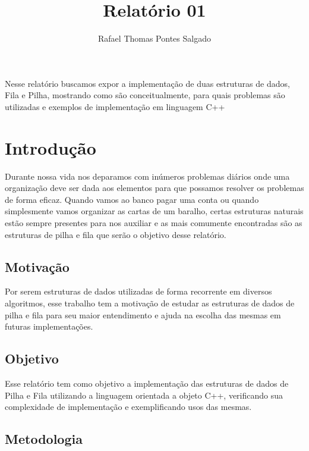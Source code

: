 \documentclass[rascunho,xindy,sublist]{fei}
\author{Rafael Thomas Pontes Salgado}
\title{Relatório 01}
\begin{document}
\maketitle

\begin{resumo}
Nesse relatório buscamos expor a implementação de duas estruturas de dados, Fila e Pilha, mostrando como são conceitualmente, para quais problemas são utilizadas e exemplos de implementação em linguagem C++ 
\end{resumo}

\listoffigures
\listoftables
\printglossaries
\tableofcontents

\chapter{Introdução}

Durante nossa vida nos deparamos com inúmeros problemas diários onde uma organização deve ser dada aos elementos para que possamos resolver os problemas de forma eficaz. Quando vamos ao banco pagar uma conta ou quando simplesmente vamos organizar as cartas de um baralho, certas estruturas naturais estão sempre presentes para nos auxiliar e as mais comumente encontradas são as estruturas de pilha e fila que serão o objetivo desse relatório.

\section{Motivação}

Por serem estruturas de dados utilizadas de forma recorrente em diversos algoritmos, esse trabalho tem a motivação de estudar as estruturas de dados de pilha e fila para seu maior entendimento e ajuda na escolha das mesmas em futuras implementações.

\section{Objetivo}

Esse relatório tem como objetivo a implementação das estruturas de dados de Pilha e Fila utilizando a linguagem orientada a objeto C++, verificando sua complexidade de implementação e exemplificando usos das mesmas.

\section{Metodologia}
\end{document}
